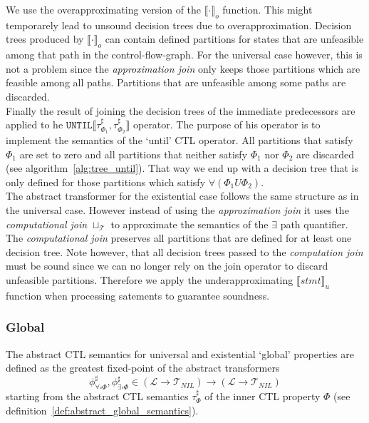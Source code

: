 \documentclass[11pt,a4paper,titlepage]{article}
\theoremstyle{definition}
\begin{document}
We use the overapproximating version of the ${\llbracket \cdot \rrbracket}_{o}$ function. 
This might temporarely lead to unsound decision trees due to overapproximation. 
Decision trees produced by ${\llbracket \cdot \rrbracket}_{o}$ can contain defined partitions for states that are unfeasible 
among that path in the control-flow-graph. For the universal case however, this is not a problem since the 
\textit{approximation join} only keeps those partitions which are feasible among all paths. 
Partitions that are unfeasible among some paths are discarded.\\

Finally the result of joining the decision trees of the immediate predecessors are 
applied to he $\mathtt{UNTIL}\llbracket \tau^\sharp_{\Phi_1}, \tau^\sharp_{\Phi_2} \rrbracket $ operator. 
The purpose of his operator is to implement the semantics of the `until' CTL operator. 
All partitions that satisfy $\Phi_1$ are set to zero and all partitions that neither 
satisfy $\Phi_1$ nor $\Phi_2$ are discarded (see algorithm~\ref{alg:tree_until}).
That way we end up with a decision tree that is only defined for those partitions which satisfy $\forall(\Phi_1 U \Phi_2)$.\\


The abstract transformer for the existential case follows the same structure as in the universal case. 
However instead of using the \textit{approximation join} it uses the \textit{computational join} $\sqcup_\mathcal{T}$ 
to approximate the semantics of the $\exists$ path quantifier. 
The \textit{computational join} preserves all partitions that are defined for at least one decision tree. 
Note however, that all decision trees passed to the \textit{computation join} must be sound since we can no longer 
rely on the join operator to discard unfeasible partitions. Therefore we apply the underapproximating ${\llbracket stmt \rrbracket}_{u}$ 
function when processing satements to guarantee soundness.


\subsubsection*{Global}
The abstract CTL semantics for universal and existential `global' properties are defined as the greatest fixed-point of the abstract transformers
\[
    \phi^\sharp_{\forall\square\Phi}, \phi^\sharp_{\exists\square\Phi} 
\in (\mathcal{L} \rightarrow \mathcal{T}_{NIL}) \rightarrow (\mathcal{L} \rightarrow \mathcal{T}_{NIL})
\]
starting from the abstract CTL semantics $\tau^\sharp_\Phi$ of the inner CTL property $\Phi$ (see definition~\ref{def:abstract_global_semantics}).
\end{document}
